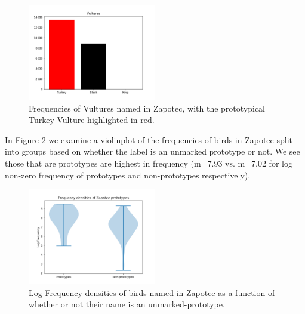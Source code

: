 \documentclass[10pt,letterpaper]{article}
\begin{document}
\begin{figure}[ht!]
  \begin{center}
    \includegraphics[width=0.5\textwidth]{./figures/prototype-barplot-vultures.png}
        \caption{Frequencies of Vultures named in Zapotec, with the prototypical Turkey Vulture highlighted in red.}
        \label{fig-freq-prototype-vultures}
  \end{center}
\end{figure}



In Figure \ref{fig-freq-prototype-densities} we examine a violinplot of the frequencies of birds in Zapotec split into groups based on whether the label is an unmarked prototype or not. We see those that are prototypes are highest in frequency (m=7.93 vs. m=7.02 for log non-zero frequency of prototypes and non-prototypes respectively).

\begin{figure}[ht!]
  \begin{center}
    \includegraphics[width=0.5\textwidth]{./figures/prototypefreqs-violinplots.png}
        \caption{Log-Frequency densities of birds named in Zapotec as a function of whether or not their name is an unmarked-prototype.}
        \label{fig-freq-prototype-densities}
  \end{center}
\end{figure}
\end{document}
